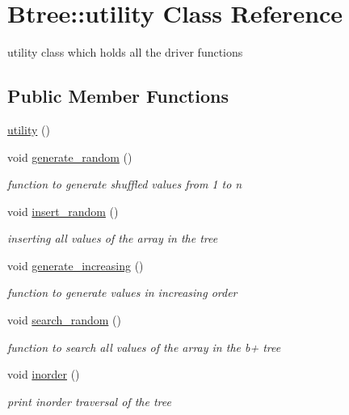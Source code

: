 \hypertarget{class_btree_1_1utility}{\section{Btree\-:\-:utility Class Reference}
\label{class_btree_1_1utility}
}


utility class which holds all the driver functions  


\subsection*{Public Member Functions}
\begin{DoxyCompactItemize}
\item 
\hyperlink{class_btree_1_1utility_aa8aade55ad53d569342491a7c7c1c0c9}{utility} ()
\item 
void \hyperlink{class_btree_1_1utility_a02cc6a344924615dde82089ca16150c0}{generate\-\_\-random} ()
\begin{DoxyCompactList}\small\item\em function to generate shuffled values from 1 to n \end{DoxyCompactList}\item 
void \hyperlink{class_btree_1_1utility_ace83b2110e9982395da53ba59ee1105a}{insert\-\_\-random} ()
\begin{DoxyCompactList}\small\item\em inserting all values of the array in the tree \end{DoxyCompactList}\item 
void \hyperlink{class_btree_1_1utility_ac28ba2fad253481db02c499762f85edc}{generate\-\_\-increasing} ()
\begin{DoxyCompactList}\small\item\em function to generate values in increasing order \end{DoxyCompactList}\item 
void \hyperlink{class_btree_1_1utility_a21786d75160a31474dfbd93c61ed5559}{search\-\_\-random} ()
\begin{DoxyCompactList}\small\item\em function to search all values of the array in the b+ tree \end{DoxyCompactList}\item 
void \hyperlink{class_btree_1_1utility_ab9637d54965e6847ee60ddc2dd3dce82}{inorder} ()
\begin{DoxyCompactList}\small\item\em print inorder traversal of the tree \end{DoxyCompactList}\item 

\end{DoxyCompactItemize}
